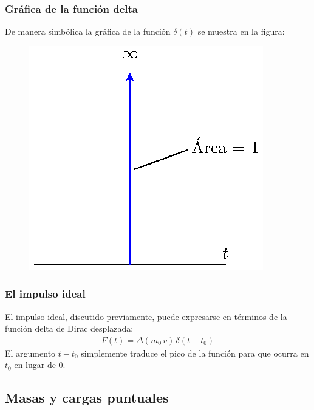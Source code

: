 \documentclass[12pt]{beamer}
\begin{document}
\begin{frame}
\frametitle{Gráfica de la función delta}
De manera simbólica la gráfica de la función $\delta (t)$ se muestra en la figura:
\pause
\begin{figure}[H]
        \centering
        \includegraphics[scale=1]{Imagenes/delta_Dirac_Momento_05.eps}
    \end{figure}
\end{frame}
\begin{frame}
\frametitle{El impulso ideal}
El impulso ideal, discutido previamente, puede expresarse en términos de la función delta de Dirac desplazada:
\pause
\begin{align}
F(t) = \Delta (m_{0} \, v) \, \delta (t - t_{0})
\label{eq:ecuacion_05_04}
\end{align}
\pause
El argumento $t - t_{0}$ simplemente traduce el pico de la función para que ocurra en $t_{0}$ en lugar de $0$.
\end{frame}

\subsection{Masas y cargas puntuales}
\end{document}
